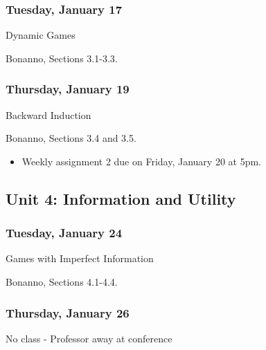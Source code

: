 \documentclass[
]{article}
\providecommand{\tightlist}{%
  \setlength{\itemsep}{0pt}\setlength{\parskip}{0pt}}
\begin{document}
\begin{multicols}{2}

\hypertarget{tuesday-january-17}{%
\subsubsection{Tuesday, January 17}\label{tuesday-january-17}}

\begin{description}
\tightlist
\item[Topic]
Dynamic Games
\item[Reading]
Bonanno, Sections 3.1-3.3.
\end{description}

\hypertarget{thursday-january-19}{%
\subsubsection{Thursday, January 19}\label{thursday-january-19}}

\begin{description}
\tightlist
\item[Topic]
Backward Induction
\item[Reading]
Bonanno, Sections 3.4 and 3.5.
\end{description}

\end{multicols}

\begin{itemize}
\tightlist
\item
  Weekly assignment 2 due on Friday, January 20 at 5pm.
\end{itemize}

\newpage

\hypertarget{unit-4-information-and-utility}{%
\subsection{Unit 4: Information and
Utility}\label{unit-4-information-and-utility}}

\begin{multicols}{2}

\hypertarget{tuesday-january-24}{%
\subsubsection{Tuesday, January 24}\label{tuesday-january-24}}

\begin{description}
\tightlist
\item[Topic]
Games with Imperfect Information
\item[Reading]
Bonanno, Sections 4.1-4.4.
\end{description}

\hypertarget{thursday-january-26}{%
\subsubsection{Thursday, January 26}\label{thursday-january-26}}

No class - Professor away at conference

\end{multicols}
\end{document}
